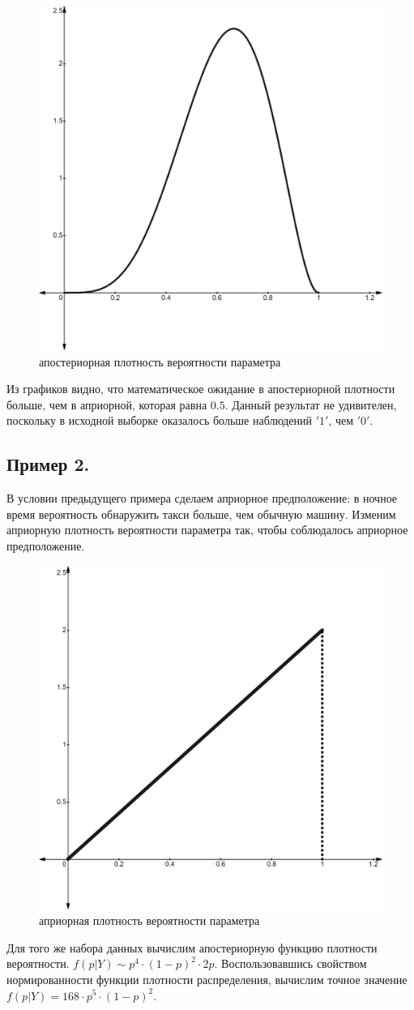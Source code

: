 \documentclass[a4paper,12pt]{article}
\begin{document}
\begin{figure}[H]
    \centering
    \includegraphics[width=0.3\linewidth]{src/img/апостериорное_респределение_1.png}
    \caption{апостериорная плотность вероятности параметра}
\end{figure}

Из графиков видно, что математическое ожидание в апостериорной плотности больше, чем в априорной, которая равна $0.5$. Данный результат не удивителен, поскольку в исходной выборке оказалось больше наблюдений $'1'$, чем $'0'$.



\subsection*{Пример 2.\\}

В условии предыдущего примера сделаем априорное предположение: в ночное время вероятность обнаружить такси больше, чем обычную машину. Изменим априорную плотность вероятности параметра так, чтобы соблюдалось априорное предположение.

\begin{figure}[H]
    \centering
    \includegraphics[width=0.3\linewidth]{src/img/априорное_респределение_2.png}
    \caption{априорная плотность вероятности параметра}
\end{figure}

Для того же набора данных вычислим апостериорную функцию плотности вероятности.  $f(p|Y) \sim p^4 \cdot (1 - p)^2 \cdot 2p$. Воспользовавшись свойством нормированности функции плотности распределения, вычислим точное значение $f(p|Y) = 168 \cdot p^5 \cdot (1 - p)^2$.
\end{document}

